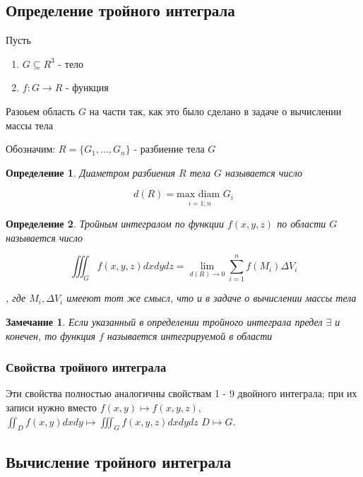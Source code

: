 \documentclass[a4paper, 14pt]{report}
\newtheorem{defenition}{Определение}[section]
\newtheorem{note}{Замечание}[section]
\begin{document}
\subsection{Определение тройного интеграла}

Пусть 

\begin{enumerate}
    \item $G \subseteq R^3$ - тело
    \item $f:G \to R$ - функция
\end{enumerate}

Разоьем область $G$ на части так, как это было сделано в задаче о вычислении массы тела

Обозначим: $R = \{G_1,...,G_n\}$ - разбиение тела $G$

\begin{defenition}
    Диаметром разбиения $R$ тела $G$ называется число

    $$
    d(R) = \underset{i = \overline{1;n}}{\text{max diam }} G_i
    $$
\end{defenition}

\begin{defenition}
    Тройным интегралом по функции $f(x,y,z)$ по области $G$ называется число 

    $$
    \iiint_G f(x,y,z) dxdydz = \lim_{d(R) \to 0} \sum_{i=1}^n f(M_i) \Delta V_i
    $$

    , где $M_i, \Delta V_i$ имееют тот же смысл, что и в задаче о вычислении массы тела
\end{defenition}

\begin{note}
    Если указанный в определении тройного интеграла предел $\exists$ и конечен, то функция $f$ называется интегрируемой в области 
\end{note}

\subsubsection{Свойства тройного интеграла}

Эти свойства полностью аналогичны свойствам 1 - 9 двойного интеграла; при их записи нужно вместо $f(x,y) \mapsto f(x,y,z)$, $\iint_D f(x,y) dxdy \mapsto \iiint_G f(x,y,z) dxdydz$ $D \mapsto G$.

\subsection{Вычисление тройного интеграла}
\end{document}

